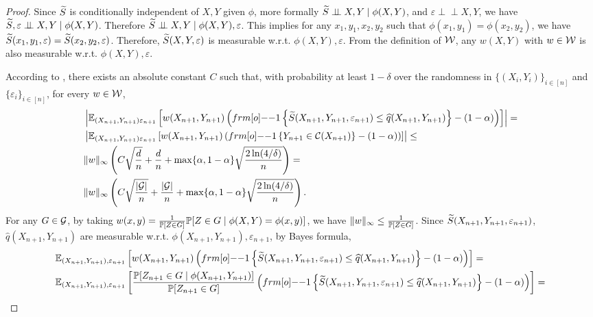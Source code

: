 \begin{proof}
Since ${\widetilde{S}}$ is conditionally independent of $X,Y$ given $\phi$, more formally ${\widetilde{S}} \perp\!\!\!\perp X,Y \mid \phi(X,Y)$, and $\varepsilon \perp\!\!\!\perp X,Y$, we have ${\widetilde{S}}, \varepsilon \perp\!\!\!\perp X,Y \mid \phi(X,Y)$. Therefore ${\widetilde{S}} \perp\!\!\!\perp X,Y \mid \phi(X,Y), \varepsilon$. This implies for any $x_1,y_1,x_2,y_2$ such that $\phi(x_1,y_1) = \phi(x_2,y_2)$, we have ${\widetilde{S}}(x_1,y_1,\varepsilon) = {\widetilde{S}}(x_2,y_2,\varepsilon)$. Therefore, ${\widetilde{S}}(X,Y,\varepsilon)$ is measurable w.r.t. $\phi(X,Y),\varepsilon$. From the definition of ${\cal W}$, any $w(X,Y)$ with $w\in{\cal W}$ is also measurable w.r.t. $\phi(X,Y),\varepsilon$.

According to , there exists an absolute constant $C$ such that, with probability at least $1-\delta$ over the randomness in $\{(X_i,Y_i)\}_{i\in [n]}$ and $\{\varepsilon_i\}_{i \in [n]}$, for every $w \in {\cal W}$, 
\begin{align*}
&\left|\EE_{(X_{n+1},Y_{n+1}) \varepsilon_{n+1}}\qth{w(X_{n+1},Y_{n+1})\pth{\11\sth{ \tS(X_{n+1},Y_{n+1},\varepsilon_{n+1}) \leq \hat q (X_{n+1},Y_{n+1}) }- (1-\alpha)}}\right| = \\
&\left|\EE_{(X_{n+1},Y_{n+1}) \varepsilon_{n+1}}\qth{w(X_{n+1},Y_{n+1})\pth{\11\sth{Y_{n+1} \in \calC(X_{n+1})}- (1-\alpha)}}\right| \leq \\
&{} 
\|w\|_{\infty} \pth{C \sqrt{\frac{d}{n}} + \frac{d}{n} +\max \{\alpha, 1-\alpha\}\sqrt{\frac{2\ln(4/\delta)}{n}} } = \\
&\|w\|_{\infty} \pth{C \sqrt{\frac{|\calG|}{n}} + \frac{|\calG|}{n} +\max \{\alpha, 1-\alpha\}\sqrt{\frac{2\ln(4/\delta)}{n}} }.
\end{align*}
For any $G \in {\cal G}$, by taking $w(x,y) = \frac{1}{\mathbb{P}[Z\in G]}\mathbb{P}[Z \in G \mid \phi(X,Y)=\phi(x,y)]$, we have $\|w\|_{\infty}  \leq \frac{1}{\mathbb{P}[Z\in G]}$. Since ${\widetilde{S}}(X_{n+1},Y_{n+1},\varepsilon_{n+1})$, $\hat q (X_{n+1},Y_{n+1})$ are measurable w.r.t. $\phi(X_{n+1},Y_{n+1}), \varepsilon_{n+1}$, by Bayes formula,
\begin{align*} 
    &\EE_{(X_{n+1},Y_{n+1}), \varepsilon_{n+1}}\qth{w(X_{n+1},Y_{n+1})\pth{\11\sth{ \tS(X_{n+1},Y_{n+1},\varepsilon_{n+1}) \leq \hat q (X_{n+1},Y_{n+1}) }- (1-\alpha)}} = \\
    &\EE_{(X_{n+1},Y_{n+1}), \varepsilon_{n+1}}\qth{ \frac{\PP[Z_{n+1} \in G \mid \phi(X_{n+1},Y_{n+1})]}{\PP[Z_{n+1}\in G]} \pth{\11\sth{ \tS(X_{n+1},Y_{n+1},\varepsilon_{n+1}) \leq \hat q (X_{n+1},Y_{n+1}) }- (1-\alpha)}} = \\

\end{align*}
\end{proof}
